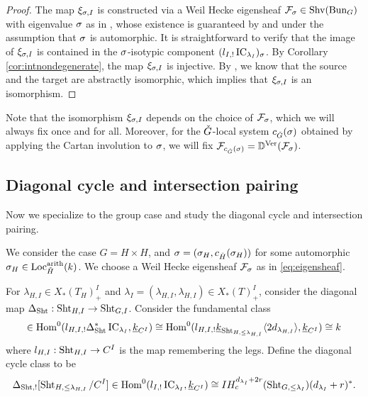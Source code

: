 \documentclass[reqno]{amsart}
\numberwithin{equation}{section}
\numberwithin{equation}{section}
\begin{document}
\begin{proof}
    The map $\xi_{\sigma,I}$ is constructed via a Weil Hecke eigensheaf $\mathcal{F}_{\sigma}\in \mathrm{Shv}(\operatorname{Bun}_G)$ with eigenvalue $\sigma$ as in \cite[(5.6)]{wang2025specialcycleshtukascategorical}, whose existence is guaranteed by \cite[Theorem\,0.1.4]{gaitsgory2025geometriclanglandspositivecharacteristic} and \cite[Main Theorem\,0.2.6]{arinkin2022automorphicfunctionstracefrobenius} under the assumption that $\sigma$ is automorphic. It is straightforward to verify that the image of $\xi_{\sigma,I}$ is contained in the $\sigma$-isotypic component $(l_{I,!}\operatorname{IC}_{\lambda_I})_{\sigma}$. By Corollary \ref{cor:intnondegenerate}, the map $\xi_{\sigma,I}$ is injective. By \cite[Main Theorem\,0.3.10]{arinkin2022automorphicfunctionstracefrobenius}, we know that the source and the target are abstractly isomorphic, which implies that $\xi_{\sigma,I}$ is an isomorphism.
\end{proof}

Note that the isomorphism $\xi_{\sigma,I}$ depends on the choice of $\mathcal{F}_{\sigma}$, which we will always fix once and for all. Moreover, for the $\check{G}$-local system $c_{\check{G}}(\sigma)$ obtained by applying the Cartan involution to $\sigma$, we will fix $\mathcal{F}_{c_{\check{G}}(\sigma)}=\mathbb{D}^{\mathrm{Ver}}(\mathcal{F}_{\sigma})$.



\subsection{Diagonal cycle and intersection pairing}
Now we specialize to the group case and study the diagonal cycle and intersection pairing. 

We consider the case $G=H\times H$, and $\sigma=(\sigma_H,c_{\check{H}}(\sigma_H))$ for some automorphic $\sigma_H\in \mathrm{Loc}_{\check{H}}^{\mathrm{arith}}(k)$. We choose a Weil Hecke eigensheaf $\mathcal{F}_{\sigma}$ as in \eqref{eq:eigensheaf}.

For $\lambda_{H,I}\in X_*(T_H)_+^I$ and $\lambda_I=(\lambda_{H,I},\lambda_{H,I})\in X_*(T)_+^I$, consider the diagonal map $\Delta_{\operatorname{Sht}}:\operatorname{Sht}_{H,I}\to \operatorname{Sht}_{G,I}$. Consider the fundamental class \begin{equation}
    [\Sht_{H,\leq\lambda_{H,I}}/C^I]\in \Hom^0(l_{H,I,!}\D_{\Sht}^*\IC_{\lambda_I}, \uk_{C^I})\cong \Hom^0(l_{H,I,!}\uk_{\Sht_{H,\leq\lambda_{H,I}}}\langle 2 d_{\lambda_{H,I}}\rangle, \uk_{C^I} ) \cong k
\end{equation} where $l_{H,I}:\operatorname{Sht}_{H,I}\to C^I$ is the map remembering the legs. Define the diagonal cycle class to be \begin{equation}
    \Delta_{\operatorname{Sht},!}[\operatorname{Sht}_{H,\leq\lambda_{H,I}}/C^I]\in \operatorname{Hom}^0(l_{I,!}\operatorname{IC}_{\lambda_I}, \underline{k}_{C^I})\cong IH^{d_{\lambda_I}+2r}_c(\operatorname{Sht}_{G,\leq\lambda_I})(d_{\lambda_I}+r)^*
.\end{equation}
\end{document}
